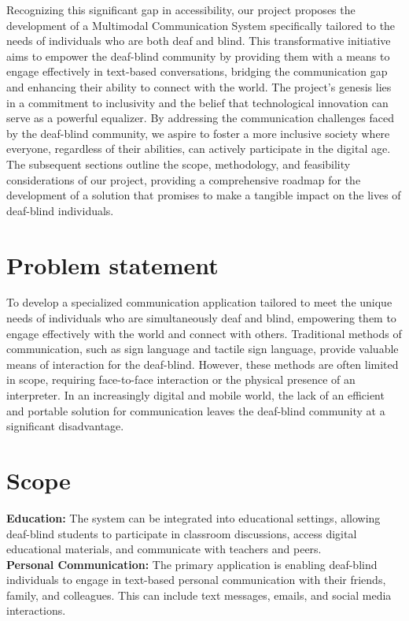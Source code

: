 \documentclass[12pt,a4paper]{report}
\begin{document}
Recognizing this significant gap in accessibility, our project proposes the development of a Multimodal Communication System specifically tailored to the needs of individuals who are both deaf and blind. This transformative initiative aims to empower the deaf-blind community by providing them with a means to engage effectively in text-based conversations, bridging the communication gap and enhancing their ability to connect with the world. The project's genesis lies in a commitment to inclusivity and the belief that technological innovation can serve as a powerful equalizer. By addressing the communication challenges faced by the deaf-blind community, we aspire to foster a more inclusive society where everyone, regardless of their abilities, can actively participate in the digital age. The subsequent sections outline the scope, methodology, and feasibility considerations of our project, providing a comprehensive roadmap for the development of a solution that promises to make a tangible impact on the lives of deaf-blind individuals.

\section{Problem statement }
To develop a specialized communication application tailored to meet the unique needs of individuals who are simultaneously deaf and blind, empowering them to engage effectively with the world and connect with others. Traditional methods of communication, such as sign language and tactile sign language, provide valuable means of interaction for the deaf-blind. However, these methods are often limited in scope, requiring face-to-face interaction or the physical presence of an interpreter. In an increasingly digital and mobile world, the lack of an efficient and portable solution for communication leaves the deaf-blind community at a significant disadvantage.


\section{Scope}
\textbf{Education:} 
The system can be integrated into educational settings, allowing
deaf-blind students to participate in classroom discussions, access digital
educational materials, and communicate with teachers and peers.\\

\noindent\textbf{Personal Communication:} 
The primary application is enabling deaf-blind
individuals to engage in text-based personal communication with their friends,
family, and colleagues. This can include text messages, emails, and social
media interactions.
\end{document}
